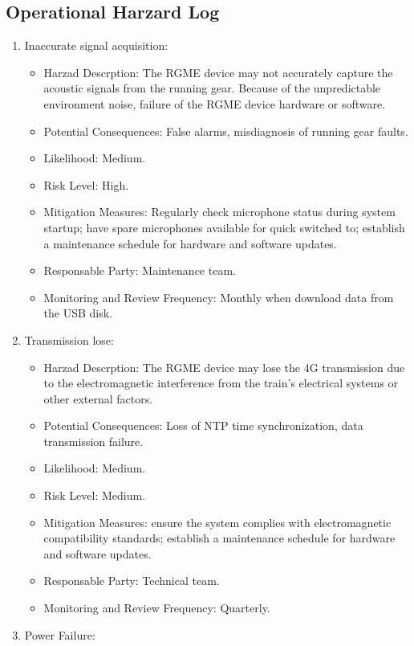 \documentclass{article}
\begin{document}
\subsection{Operational Harzard Log}
\begin{enumerate}
    \item Inaccurate signal acquisition:
    \begin{itemize}
        \item Harzad Descrption: The RGME device may not accurately capture the acoustic signals from the running gear. Because of the unpredictable environment noise, failure of the RGME device hardware or software.
        \item Potential Consequences: False alarms, misdiagnosis of running gear faults.
        \item Likelihood: Medium.
        \item Risk Level: High.
        \item Mitigation Measures: Regularly check microphone status during system startup; have spare microphones available for quick switched to; establish a maintenance schedule for hardware and software updates.
        \item Responsable Party: Maintenance team.
        \item Monitoring and Review Frequency: Monthly when download data from the USB disk.
    \end{itemize}
    \item Transmission lose:
    \begin{itemize}
        \item Harzad Descrption: The RGME device may lose the 4G transmission due to the electromagnetic interference from the train's electrical systems or other external factors.
        \item Potential Consequences: Loss of NTP time synchronization, data transmission failure.
        \item Likelihood: Medium.
        \item Risk Level: Medium.
        \item Mitigation Measures: ensure the system complies with electromagnetic compatibility standards; establish a maintenance schedule for hardware and software updates.
        \item Responsable Party: Technical team.
        \item Monitoring and Review Frequency: Quarterly.
    \end{itemize}
    \item Power Failure:

\end{enumerate}
\end{document}
